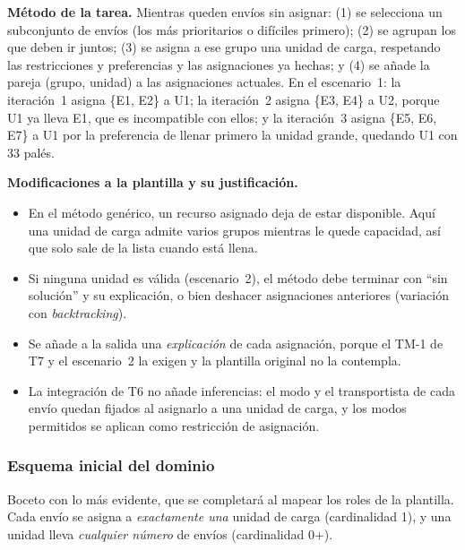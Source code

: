 \documentclass[12pt,a4paper,twoside,spanish]{article}      %
\begin{document}
\textbf{Método de la tarea.} Mientras queden envíos sin asignar: (1) se
selecciona un subconjunto de envíos (los más prioritarios o difíciles
primero); (2) se agrupan los que deben ir juntos; (3) se asigna a ese grupo
una unidad de carga, respetando las restricciones y preferencias y las
asignaciones ya hechas; y (4) se añade la pareja (grupo, unidad) a las
asignaciones actuales. En el escenario~1: la iteración~1 asigna \{E1, E2\} a
U1; la iteración~2 asigna \{E3, E4\} a U2, porque U1 ya lleva E1, que es
incompatible con ellos; y la iteración~3 asigna \{E5, E6, E7\} a U1 por la
preferencia de llenar primero la unidad grande, quedando U1 con 33 palés.

\textbf{Modificaciones a la plantilla y su justificación.}
\begin{itemize}
 \item En el método genérico, un recurso asignado deja de estar disponible.
 Aquí una unidad de carga admite varios grupos mientras le quede capacidad,
 así que solo sale de la lista cuando está llena.
 \item Si ninguna unidad es válida (escenario~2), el método debe terminar con
 ``sin solución'' y su explicación, o bien deshacer asignaciones anteriores
 (variación con \emph{backtracking}).
 \item Se añade a la salida una \emph{explicación} de cada asignación,
 porque el TM-1 de T7 y el escenario~2 la exigen y la plantilla original no
 la contempla.
 \item La integración de T6 no añade inferencias: el modo y el transportista
 de cada envío quedan fijados al asignarlo a una unidad de carga, y los modos
 permitidos se aplican como restricción de asignación.
\end{itemize}

\subsubsection{Esquema inicial del dominio}
Boceto con lo más evidente, que se completará al mapear los roles de la
plantilla. Cada envío se asigna a \emph{exactamente una} unidad de carga
(cardinalidad 1), y una unidad lleva \emph{cualquier número} de envíos
(cardinalidad 0+).
\end{document}
